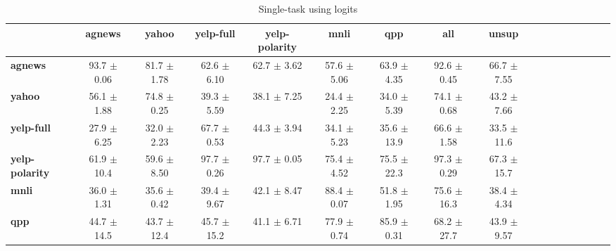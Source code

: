 \begin{table*}[h]
	\centering
	\fontsize{9}{13}
	\selectfont
	\begin{tabular}{lcccccccccccccccc}
		\toprule
		& \textbf{agnews}    & \textbf{yahoo}    & \textbf{yelp-full}    & \textbf{yelp-polarity}    & \textbf{mnli}    & \textbf{qpp}    & \textbf{all}    & \textbf{unsup}    \\ \hline
		\textbf{agnews}        & 93.7   \tiny$\pm$ 0.06      & 81.7   \tiny$\pm$ 1.78      & 62.6      \tiny$\pm$ 6.10      & 62.7          \tiny$\pm$ 3.62      & 57.6 \tiny$\pm$ 5.06      & 63.9 \tiny$\pm$ 4.35      & 92.6 \tiny$\pm$ 0.45      & 66.7   \tiny$\pm$ 7.55      \\
		\textbf{yahoo}         & 56.1    \tiny$\pm$ 1.88      & 74.8   \tiny$\pm$ 0.25      & 39.3       \tiny$\pm$ 5.59      & 38.1           \tiny$\pm$ 7.25      & 24.4  \tiny$\pm$ 2.25      & 34.0 \tiny$\pm$ 5.39      & 74.1 \tiny$\pm$ 0.68      & 43.2   \tiny$\pm$ 7.66      \\
		\textbf{yelp-full}     & 27.9    \tiny$\pm$ 6.25      & 32.0   \tiny$\pm$ 2.23      & 67.7       \tiny$\pm$ 0.53      & 44.3           \tiny$\pm$ 3.94      & 34.1  \tiny$\pm$ 5.23      & 35.6 \tiny$\pm$ 13.9      & 66.6 \tiny$\pm$ 1.58      & 33.5   \tiny$\pm$ 11.6      \\
		\textbf{yelp-polarity} & 61.9    \tiny$\pm$ 10.4      & 59.6   \tiny$\pm$ 8.50      & 97.7       \tiny$\pm$ 0.26      & 97.7           \tiny$\pm$ 0.05      & 75.4  \tiny$\pm$ 4.52      & 75.5 \tiny$\pm$ 22.3      & 97.3 \tiny$\pm$ 0.29      & 67.3   \tiny$\pm$ 15.7      \\
		\textbf{mnli}          & 36.0    \tiny$\pm$ 1.31      & 35.6   \tiny$\pm$ 0.42      & 39.4       \tiny$\pm$ 9.67      & 42.1           \tiny$\pm$ 8.47      & 88.4  \tiny$\pm$ 0.07      & 51.8 \tiny$\pm$ 1.95      & 75.6 \tiny$\pm$ 16.3      & 38.4   \tiny$\pm$ 4.34      \\
		\textbf{qpp}           & 44.7    \tiny$\pm$ 14.5      & 43.7   \tiny$\pm$ 12.4      & 45.7       \tiny$\pm$ 15.2      & 41.1           \tiny$\pm$ 6.71      & 77.9  \tiny$\pm$ 0.74      & 85.9 \tiny$\pm$ 0.31      & 68.2 \tiny$\pm$ 27.7      & 43.9   \tiny$\pm$ 9.57      \\ \bottomrule
	\end{tabular}
	\caption{Single-task using logits}\label{tab:single-on-train-set-summary}
\end{table*}
